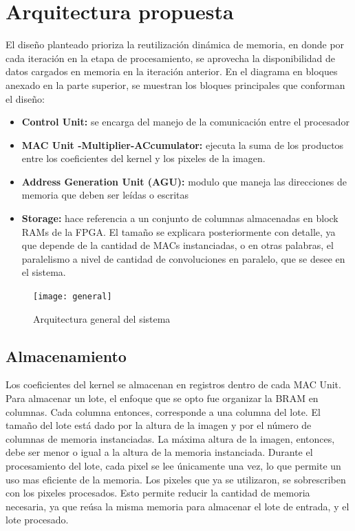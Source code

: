 \section{Arquitectura propuesta}  \label{ourdesign_subsecs}


El diseño planteado prioriza la reutilización dinámica de memoria, en donde por cada iteración en la etapa de procesamiento, se aprovecha la disponibilidad de datos cargados en memoria en la iteración anterior. 
En el diagrama en bloques anexado en la parte superior, se muestran los bloques principales que conforman el diseño:

\begin{itemize}
\item \textbf{Control Unit:} se encarga del manejo de la comunicación entre el procesador
\item \textbf{MAC Unit -Multiplier-ACcumulator:} ejecuta la suma de los productos entre los coeficientes del kernel y los pixeles de la imagen. 
\item \textbf{Address Generation Unit (AGU):} modulo que maneja las direcciones de memoria que deben ser leídas o escritas
\item \textbf{Storage:} hace referencia a un conjunto de columnas almacenadas en block RAMs de la FPGA. El tamaño se explicara posteriormente con detalle, ya que depende de la cantidad de MACs instanciadas, o en otras palabras, el paralelismo a nivel de cantidad de convoluciones en paralelo, que se desee en el sistema.
\end{itemize}
     
\begin{figure}
\centering
\texttt{[image: general]}
\caption{Arquitectura general del sistema }
\label{general}
\end{figure}

\subsection{Almacenamiento}  \label{storage_subsecc}
Los coeficientes del kernel se almacenan en registros dentro de cada MAC Unit. Para almacenar un lote, el enfoque que se opto fue organizar la BRAM en columnas. Cada columna entonces, corresponde a una columna del lote.
El tamaño del lote está dado por la altura de la imagen y por el número de columnas de memoria instanciadas.  La máxima altura de la imagen, entonces, debe ser menor o igual a la altura de la memoria instanciada.
Durante el procesamiento del lote, cada pixel se lee únicamente una vez, lo que permite un uso mas eficiente de la memoria. Los pixeles que ya se utilizaron, se sobrescriben con los pixeles procesados. 
Esto permite reducir la cantidad de memoria necesaria, ya que reúsa la misma memoria para almacenar el lote de entrada, y el lote procesado.

